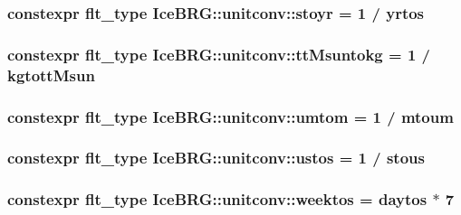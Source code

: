 \subsubsection[{stoyr}]{\setlength{\rightskip}{0pt plus 5cm}constexpr {\bf flt\+\_\+type} Ice\+B\+R\+G\+::unitconv\+::stoyr = 1 / {\bf yrtos}}\label{namespaceIceBRG_1_1unitconv_a959f815670c89ca0c81221ee0221392b}
\hypertarget{namespaceIceBRG_1_1unitconv_a8d099c28cb6a8908806f601bf0dab5f2}{}
\subsubsection[{tt\+Msuntokg}]{\setlength{\rightskip}{0pt plus 5cm}constexpr {\bf flt\+\_\+type} Ice\+B\+R\+G\+::unitconv\+::tt\+Msuntokg = 1 / {\bf kgtott\+Msun}}\label{namespaceIceBRG_1_1unitconv_a8d099c28cb6a8908806f601bf0dab5f2}
\hypertarget{namespaceIceBRG_1_1unitconv_aa1386b920e7e1910102f787af80e7da7}{}
\subsubsection[{umtom}]{\setlength{\rightskip}{0pt plus 5cm}constexpr {\bf flt\+\_\+type} Ice\+B\+R\+G\+::unitconv\+::umtom = 1 / {\bf mtoum}}\label{namespaceIceBRG_1_1unitconv_aa1386b920e7e1910102f787af80e7da7}
\hypertarget{namespaceIceBRG_1_1unitconv_acb67b5f54883d1235c9e12930c0ec099}{}
\subsubsection[{ustos}]{\setlength{\rightskip}{0pt plus 5cm}constexpr {\bf flt\+\_\+type} Ice\+B\+R\+G\+::unitconv\+::ustos = 1 / {\bf stous}}\label{namespaceIceBRG_1_1unitconv_acb67b5f54883d1235c9e12930c0ec099}
\hypertarget{namespaceIceBRG_1_1unitconv_a510b7ecd45f3a639607655e622e668d5}{}
\subsubsection[{weektos}]{\setlength{\rightskip}{0pt plus 5cm}constexpr {\bf flt\+\_\+type} Ice\+B\+R\+G\+::unitconv\+::weektos = {\bf daytos} $\ast$ 7}\label{namespaceIceBRG_1_1unitconv_a510b7ecd45f3a639607655e622e668d5}
\hypertarget{namespaceIceBRG_1_1unitconv_a470ebb18fe144ca40ff0fb7b40550af1}{}
